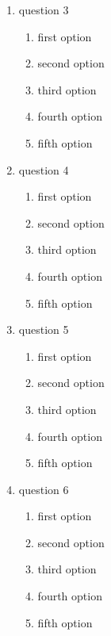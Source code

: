 \documentclass[amsfonts,bezier,leqno,fleqn,12pt,a4paper]{article}
\begin{document}
{\begin{large}
\begin{enumerate}
\begin{enumerate}
  \item first option
  \item second option
  \item third option
  \item fourth option
  \item fifth option
\end{enumerate}
\newpage
\item question 3
\vspace {0.3in}
\setcounter{equation}{0}

\begin{enumerate}
  \item first option
  \item second option
  \item third option
  \item fourth option
  \item fifth option
\end{enumerate}
\vspace {3.5cm}
\item question 4
\vspace {0.3in}
\setcounter{equation}{0}

\begin{enumerate}
  \item first option
  \item second option
  \item third option
  \item fourth option
  \item fifth option
\end{enumerate}
\newpage
\item question 5
\vspace {0.3in}
\setcounter{equation}{0}

\begin{enumerate}
  \item first option
  \item second option
  \item third option
  \item fourth option
  \item fifth option
\end{enumerate}
\vspace {3.5cm}
\item question 6
\vspace {0.3in}
\setcounter{equation}{0}

\begin{enumerate}
  \item first option
  \item second option
  \item third option
  \item fourth option
  \item fifth option
\end{enumerate}
\newpage
\end{enumerate}
\end{large}

}
\end{document}
